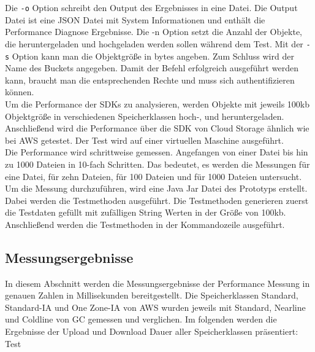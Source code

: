 Die \verb|-o| Option schreibt den Output des Ergebnisses in eine Datei. Die Output Datei ist eine JSON Datei mit System Informationen und enthält die Performance Diagnose Ergebnisse. Die -n Option setzt die Anzahl der Objekte, die heruntergeladen und hochgeladen werden sollen während dem Test. Mit der \verb|-s| Option kann man die Objektgröße in bytes angeben. Zum Schluss wird der Name des Buckets angegeben. Damit der Befehl erfolgreich ausgeführt werden kann, braucht man die entsprechenden Rechte und muss sich authentifizieren können.\\

Um die Performance der SDKs zu analysieren, werden Objekte mit jeweils 100kb Objektgröße in verschiedenen Speicherklassen hoch-, und heruntergeladen. Anschließend wird die Performance über die SDK von Cloud Storage ähnlich wie bei AWS getestet. Der Test wird auf einer virtuellen Maschine ausgeführt.\\

Die Performance wird schrittweise gemessen. Angefangen von einer Datei bis hin zu 1000 Dateien in 10-fach Schritten. Das bedeutet, es werden die Messungen für eine Datei, für zehn Dateien, für 100 Dateien und für 1000 Dateien untersucht. Um die Messung durchzuführen, wird eine Java Jar Datei des Prototyps erstellt. Dabei werden die Testmethoden ausgeführt. Die Testmethoden generieren zuerst die Testdaten gefüllt mit zufälligen String Werten in der Größe von 100kb. Anschließend werden die Testmethoden in der Kommandozeile ausgeführt.

\newpage

\subsection{Messungsergebnisse}

In diesem Abschnitt werden die Messungsergebnisse der Performance Messung in genauen Zahlen in Millisekunden bereitgestellt. Die Speicherklassen Standard, Standard-IA und One Zone-IA von AWS wurden jeweils mit Standard, Nearline und Coldline von GC gemessen und verglichen. Im folgenden werden die Ergebnisse der Upload und Download Dauer aller Speicherklassen präsentiert: Test

